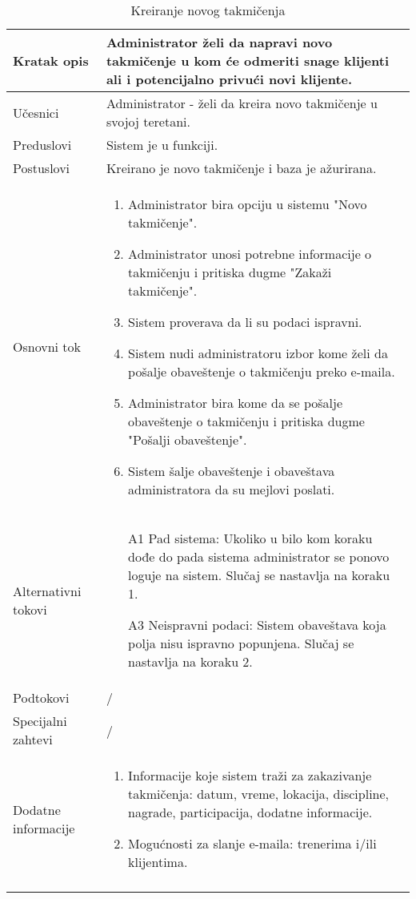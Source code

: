 \documentclass[../../main.tex]{subfiles}
\begin{document}
\begin{longtable}{| p{} | p{} |} 
\hline
    Kratak opis &  Administrator želi da napravi novo takmičenje u kom će odmeriti snage klijenti ali i potencijalno privući novi klijente. \\ 
\hline    
    Učesnici & Administrator - želi da kreira novo takmičenje u svojoj teretani.\\
\hline
   Preduslovi & Sistem je u funkciji. \\
\hline  
    Postuslovi & Kreirano je novo takmičenje i baza je ažurirana.\\
\hline
    Osnovni tok & \begin{enumerate}
        \item Administrator bira opciju u sistemu "Novo takmičenje".
        \item Administrator unosi potrebne informacije o takmičenju i pritiska dugme "Zakaži takmičenje".
        \item Sistem proverava da li su podaci ispravni.
        \item Sistem nudi administratoru izbor kome želi da pošalje obaveštenje o takmičenju preko e-maila.
        \item Administrator bira kome da se pošalje obaveštenje o takmičenju i pritiska dugme "Pošalji obaveštenje".
        \item Sistem šalje obaveštenje i obaveštava administratora da su mejlovi poslati.
    \end{enumerate}\\
\hline
    Alternativni tokovi &  \begin{itemize}
        \item[A1] Pad sistema: Ukoliko u bilo kom koraku dođe do pada sistema administrator se ponovo loguje na sistem. Slučaj se nastavlja na koraku 1.  
        \item[A3] Neispravni podaci: Sistem obaveštava koja polja nisu ispravno popunjena. Slučaj se nastavlja na koraku 2.
    \end{itemize}\\
\hline
    Podtokovi & /\\
\hline
    Specijalni zahtevi & /\\
\hline
    Dodatne informacije & \begin{enumerate}
        \item Informacije koje sistem traži za zakazivanje takmičenja: datum, vreme, lokacija, discipline, nagrade, participacija, dodatne informacije.
        \item Mogućnosti za slanje e-maila: trenerima i/ili klijentima.
    \end{enumerate}\\
\hline
\caption{Kreiranje novog takmičenja}
\end{longtable}
\end{document}
